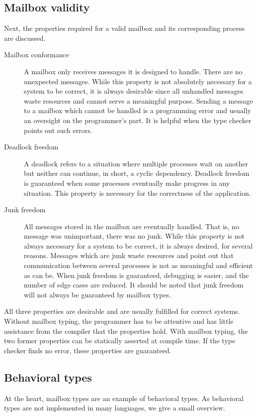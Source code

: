 \subsection{Mailbox validity}

Next, the properties required for a valid mailbox and its corresponding process are discussed.

\begin{description}
    \item[Mailbox conformance] 
    A mailbox only receives messages it is designed to handle.
    There are no unexpected messages.
    While this property is not absolutely necessary for a system to be correct, it is always desirable since all unhandled messages waste resources and cannot serve a meaningful purpose.
    Sending a message to a mailbox which cannot be handled is a programming error and usually an oversight on the programmer's part.
    It is helpful when the type checker points out such errors.
    \item[Deadlock freedom] A deadlock refers to a situation where multiple processes wait on another but neither can continue, in short, a cyclic dependency.
    Deadlock freedom is guaranteed when some processes eventually make progress in any situation.
    This property is necessary for the correctness of the application.
    \item[Junk freedom] All messages stored in the mailbox are eventually handled.
    That is, no message was unimportant, there was no junk.
    While this property is not always necessary for a system to be correct, it is always desired, for several reasons.
    Messages which are junk waste resources and point out that communication between several processes is not as meaningful and efficient as can be.
    When junk freedom is guaranteed, debugging is easier, and the number of edge cases are reduced. It should be noted that junk freedom will not always be guaranteed by mailbox types.
\end{description}


All three properties are desirable and are usually fulfilled for correct systems.
Without mailbox typing, the programmer has to be attentive and has little assistance from the compiler that the properties hold.
With mailbox typing, the two former properties can be statically asserted at compile time.
If the type checker finds no error, these properties are guaranteed.


\subsection{Behavioral types}
At the heart, mailbox types are an example of behavioral types.
As behavioral types are not implemented in many languages, we give a small overview.


